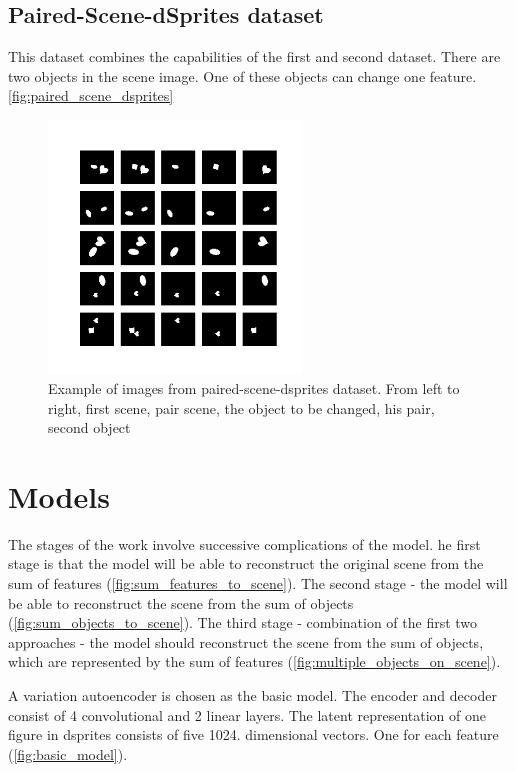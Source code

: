 \documentclass{article}
\begin{document}
    \subsection{Paired-Scene-dSprites dataset}

    This dataset combines the capabilities of the first and second dataset.
    There are two objects in the scene image.
    One of these objects can change one feature. \autoref{fig:paired_scene_dsprites}

    \begin{figure}[ht]
        \centering
        \includegraphics[width=0.6\textwidth]{img/datasets/paired-scenes-dsprites}
        \caption{Example of images from paired-scene-dsprites dataset. From left to right,
            first scene, pair scene, the object to be changed, his pair, second object}
        \label{fig:paired_scene_dsprites}
    \end{figure}


    \section{Models}

    The stages of the work involve successive complications of the model.
    he first stage is that the model will be able to reconstruct the
    original scene from the sum of features (\autoref{fig:sum_features_to_scene}).
    The second stage - the model will be able to reconstruct the scene
    from the sum of objects (\autoref{fig:sum_objects_to_scene}). The third stage - combination of the first
    two approaches - the model should reconstruct the scene
    from the sum of objects, which are represented by the sum of features (\autoref{fig:multiple_objects_on_scene}).

    A variation autoencoder is chosen as the basic model. The encoder and
    decoder consist of 4 convolutional and 2 linear layers. The latent
    representation of one figure in dsprites consists of five 1024.
    dimensional vectors. One for each feature (\autoref{fig:basic_model}).
\end{document}
